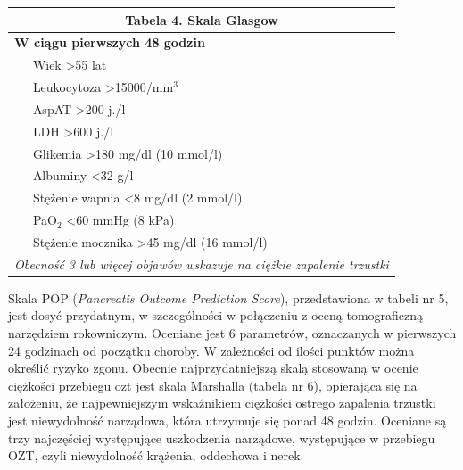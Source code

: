 \documentclass[a4paper, 12pt]{report}
\begin{document}
\begin{table}[!h]
\begin{center}
\begin{footnotesize}
\begin{tabular}{|l l|}
\hline
\multicolumn{2}{|c|}{\cellcolor[gray]{0.9} \textbf{Tabela 4. Skala Glasgow}}\\
\hline \hline
\multicolumn{2}{|l|}{\textbf{W ciągu pierwszych 48 godzin}}\\
\hline
 & Wiek >55 lat\\
 & Leukocytoza >15000/mm$^3$\\
 & AspAT >200 j./l\\
 & LDH >600 j./l\\
 & Glikemia >180 mg/dl (10 mmol/l)\\
 & Albuminy <32 g/l\\
 & Stężenie wapnia <8 mg/dl (2 mmol/l)\\
 & PaO$_2$ <60 mmHg (8 kPa)\\
 & Stężenie mocznika >45 mg/dl (16 mmol/l)\\
\hline \hline
\multicolumn{2}{|p{10cm}|}{\textsl{Obecność 3 lub więcej objawów wskazuje na ciężkie
  zapalenie trzustki}}\\
\hline
\end{tabular}
\end{footnotesize}
\end{center}
\end{table}

Skala POP (\textsl{Pancreatis Outcome Prediction Score}), przedstawiona
w tabeli nr 5, jest dosyć przydatnym, w szczególności w połączeniu z
oceną tomograficzną narzędziem rokowniczym. Oceniane jest 6
parametrów, oznaczanych w pierwszych 24 godzinach od początku
choroby. W zależności od ilości punktów można określić ryzyko zgonu.
Obecnie najprzydatniejszą skalą stosowaną w ocenie ciężkości przebiegu
ozt jest skala Marshalla (tabela nr 6), opierająca się na założeniu,
że najpewniejszym wskaźnikiem ciężkości ostrego zapalenia trzustki
jest niewydolność narządowa, która utrzymuje się ponad 48 godzin.
Oceniane są trzy najczęściej występujące uszkodzenia narządowe,
występujące w przebiegu OZT, czyli niewydolność krążenia, oddechowa i
nerek.
\end{document}
